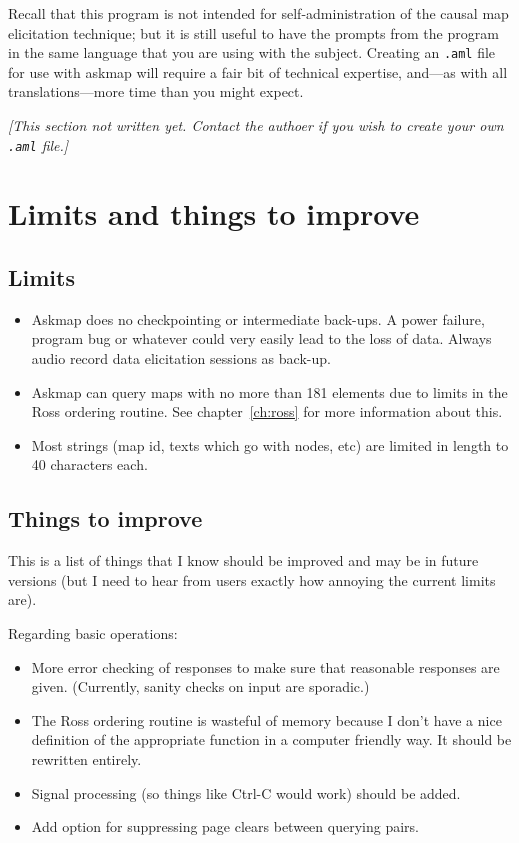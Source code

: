\documentclass[%
	11pt,
        a4paper,
        twoside]{workrep}
\newcommand*{\prg}[1]{\textsf{#1}}		%
\newcommand*{\file}[1]{\texttt{#1}}		%
\newcommand{\dash}{---}
\begin{document}
Recall that this program is not intended for self-administration
of the causal map elicitation technique; but it is still useful to
have the prompts from the program in the same language that you
are using with the subject.  Creating an \file{.aml} file for
use with \prg{askmap} will require a fair bit of technical expertise,
and\dash as with all translations\dash more time than you might expect.


\begin{center}
\itshape [This section not written yet.  Contact the authoer if you
wish to create your own \file{.aml} file.]
\end{center}

\section{Limits and things to improve}

\subsection{Limits}

\begin{itemize}
\item{} \prg{Askmap} does no checkpointing or intermediate back-ups.
    A power failure, program bug or whatever could very easily lead
    to the loss of data.  Always audio record data elicitation sessions
    as back-up.

\item{} \prg{Askmap} can query maps with no more than 181 elements due to
    limits in the Ross ordering routine.  See chapter~\ref{ch:ross} for
    more information about this.

\item Most strings (map id, texts which go with nodes, etc) are limited
   in length to 40 characters each.
\end{itemize}

\subsection{Things to improve}

This is a list of things that I know should be improved and may
be in future versions (but I need to hear from users exactly how
annoying the current limits are).

\noindent
Regarding basic operations:
\begin{itemize}
\item
 More error checking of responses to make sure that
   reasonable responses are given.  (Currently, sanity checks on input
   are sporadic.)
\item
 The Ross ordering routine is wasteful of memory because
   I don't have a nice definition of the appropriate function in
   a computer friendly way.  It should be rewritten entirely.
\item
 Signal processing (so things like Ctrl-C would work) should be
   added.
\item
 Add option for suppressing page clears between querying pairs.
\end{itemize}
\end{document}
